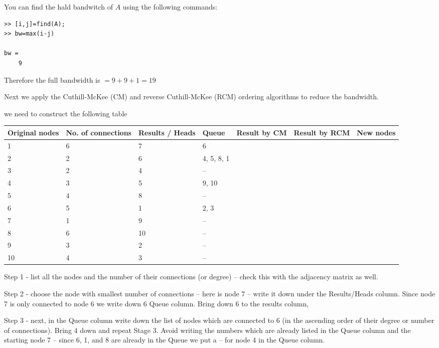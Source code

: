 \begin{enumerate}
    You can find the hald bandwitch of $A$ using the following commands:
    \begin{lstlisting}
>> [i,j]=find(A);
>> bw=max(i-j)

bw =
    9
    \end{lstlisting}
    Therefore the full bandwidth is $= 9 + 9 + 1 = 19$

    Next we apply the Cuthill-McKee (CM) and reverse Cuthill-McKee (RCM)
    ordering algorithms to reduce the bandwidth.

    we need to construct the following table
    \begin{center}
        \renewcommand{\arraystretch}{1.2}
        \setlength{\tabcolsep}{6pt}
        \begin{tabular}{p{15mm}p{20mm}p{15mm}p{18mm}p{16mm}p{16mm}p{15mm}}
            Original nodes & No. of connections & Results / Heads & Queue
            & Result by CM & Result by RCM & New nodes\\
            \hline
             1 & 6 &  7 & 6\\
             2 & 2 &  6 & 4, 5, 8, 1\\
             3 & 2 &  4 & --\\
             4 & 3 &  5 & 9, 10\\
             5 & 4 &  8 & --\\
             6 & 5 &  1 & 2, 3\\
             7 & 1 &  9 & --\\
             8 & 6 & 10 & --\\
             9 & 3 &  2 & --\\
            10 & 4 &  3 & --\\
        \end{tabular}
    \end{center}
    Step 1 - list all the nodes and the number of their connections (or degree)
    -- check this with the adjacency matrix as well.

    Step 2 - choose the node with smallest number of connections --  here is
    node 7 -- write it down under the Results/Heads column.
    Since node 7 is only connected to node 6 we write down 6 Queue column.
    Bring down 6 to the results column,

    Step 3 - next, in the Queue column write down the list of nodes which are
    connected to 6 (in the ascending order of their degree or number of
    connections).
    Bring 4 down and repeat Stage 3.
    Avoid writing the numbers which are already listed in the Queue column and
    the starting node 7 -- since 6, 1, and 8 are already in the Queue we put a
    -- for node 4 in the Queue column.


\end{enumerate}
